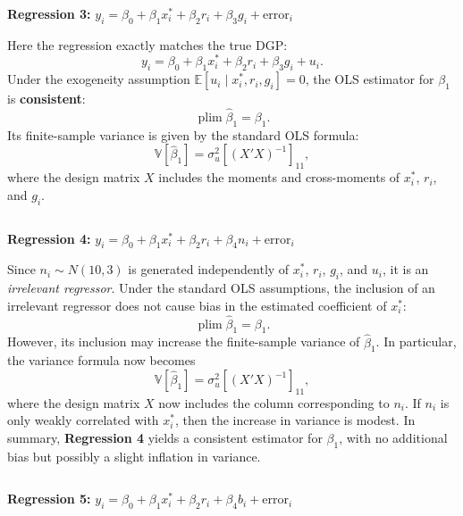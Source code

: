 \documentclass[a4paper,12pt]{article} %
\theoremstyle{nonitalic}
\newenvironment{solution}[1]
  {\renewcommand\theinnercustomsol{#1}\innercustomsol}
  {\endinnercustomsol}
\newcounter{solutionctr}
\renewcommand{\thesolutionctr}{(\alph{solutionctr})}
\newenvironment{autosolution}
  {\stepcounter{solutionctr}\begin{solution}{\thesolutionctr}}
  {\end{solution}}
\begin{document}
\begin{autosolution}
\begin{lstlisting}[language=R]

\end{lstlisting}

\textbf{Regression 3:} $y_i = \beta_0 + \beta_1 x^*_i + \beta_2 r_i + \beta_3 g_i + \text{error}_i$

Here the regression exactly matches the true DGP:
\[
y_i=\beta_0+\beta_1x_i^*+\beta_2r_i+\beta_3g_i+u_i.
\]
Under the exogeneity assumption $\mathbb{E}[u_i\mid x_i^*,r_i,g_i]=0$, the OLS estimator for $\beta_1$ is \textbf{consistent}:
\[
\operatorname*{plim}\hat{\beta}_1=\beta_1.
\]
Its finite-sample variance is given by the standard OLS formula:
\[
\mathbb{V}[\hat{\beta}_1]=\sigma_u^2\left[(X'X)^{-1}\right]_{11},
\]
where the design matrix $X$ includes the moments and cross-moments of $x_i^*$, $r_i$, and $g_i$.

\begin{lstlisting}[language=R]

\end{lstlisting}

\textbf{Regression 4:} $y_i = \beta_0 + \beta_1 x^*_i + \beta_2 r_i + \beta_4 n_i + \text{error}_i$

Since $n_i\sim N(10,3)$ is generated independently of $x_i^*$, $r_i$, $g_i$, and $u_i$, 
it is an \emph{irrelevant regressor}. 
Under the standard OLS assumptions, 
the inclusion of an irrelevant regressor does not 
cause bias in the estimated coefficient of $x_i^*$:
\[
\operatorname*{plim}\hat{\beta}_1 = \beta_1.
\]
However, its inclusion may increase the finite-sample variance of $\hat{\beta}_1$. 
In particular, the variance formula now becomes
\[
\mathbb{V}[\hat{\beta}_1] = \sigma_u^2\left[(X'X)^{-1}\right]_{11},
\]
where the design matrix $X$ now includes the column corresponding to $n_i$. 
If $n_i$ is only weakly correlated with $x_i^*$, 
then the increase in variance is modest. 
In summary, \textbf{Regression 4} yields a consistent estimator for $\beta_1$, with no additional bias but possibly a slight inflation in variance.


\begin{lstlisting}[language=R]

\end{lstlisting}

\textbf{Regression 5:} $y_i = \beta_0 + \beta_1 x^*_i + \beta_2 r_i + \beta_4 b_i + \text{error}_i$


\end{autosolution}
\end{document}
